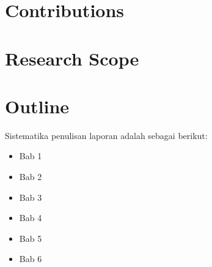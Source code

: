 \section{Contributions}

\section{Research Scope}


\section{Outline}
Sistematika penulisan laporan adalah sebagai berikut:
\begin{itemize}
	\item Bab 1 \babSatu \\
	\item Bab 2 \babDua \\
	\item Bab 3 \babTiga \\
	\item Bab 4 \babEmpat \\
	\item Bab 5 \babLima \\
	\item Bab 6 \kesimpulan \\
\end{itemize}
